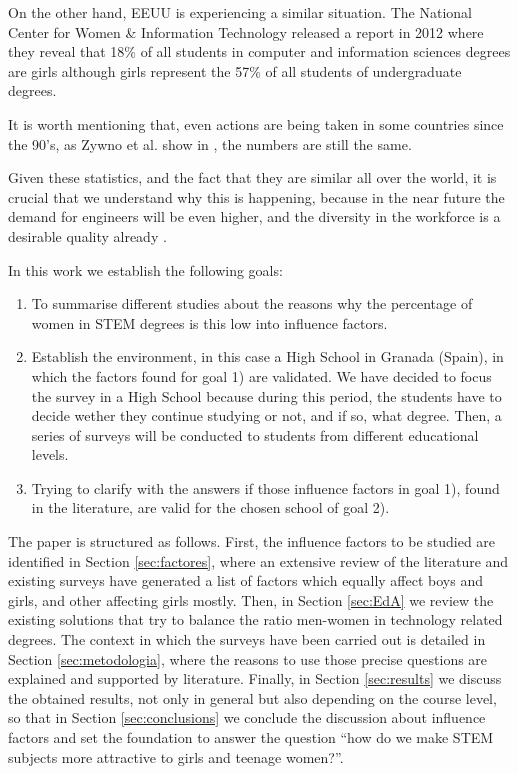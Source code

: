 \documentclass[journal,transmag]{IEEEtran}
\begin{document}
On the other hand, EEUU is experiencing a similar situation. The National Center for Women \& Information Technology released a report in 2012 \cite{NCWIT::stats} where they reveal that 18\% of all students in computer and information sciences degrees are girls although girls represent the 57\% of all students of undergraduate degrees.

It is worth mentioning that, even actions are being taken in some countries since the 90's, as Zywno et al. show in \cite{zywno1999attracting}, the numbers are still the same.

Given these statistics, and the fact that they are similar all over the world, it is crucial that we understand why this is happening, because in the near future the demand for engineers will be even higher, and the diversity in the workforce is a desirable quality already \cite{wilson1992benefits}. 

In this work we establish the following goals:
\begin{enumerate}
	\item To summarise different studies about the reasons why the percentage of women in STEM degrees is this low into influence factors.
	\item Establish the environment, in this case a High School in Granada (Spain), in which the factors found for goal 1) are validated. We have decided to focus the survey in a High School because during this period, the students have to decide wether they continue studying or not, and if so, what degree. Then, a series of surveys will be conducted to students from different educational levels.
	\item Trying to clarify with the answers if those influence factors in goal 1), found in the literature, are valid for the chosen school of goal 2).
\end{enumerate}

The paper is structured as follows. First, the influence factors to be studied are identified in Section \ref{sec:factores}, where an extensive review of the literature and existing surveys have generated a list of factors which equally affect boys and girls, and other affecting girls mostly. Then, in Section \ref{sec:EdA} we review the existing solutions that try to balance the ratio men-women in technology related degrees. The context in which the surveys have been carried out is detailed in Section \ref{sec:metodologia}, where the reasons to use those precise questions are explained and supported by literature. Finally, in Section \ref{sec:results} we discuss the obtained results, not only in general but also depending on the course level, so that in Section \ref{sec:conclusions} we conclude the discussion about influence factors and set the foundation to answer the question ``how do we make STEM subjects more attractive to girls and teenage women?''.
\end{document}
